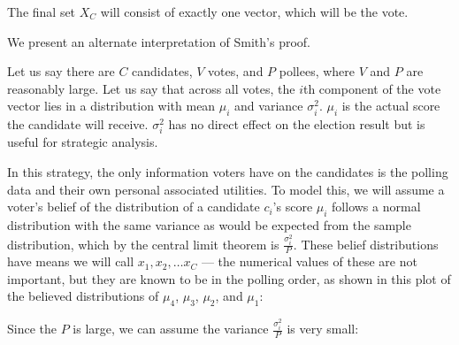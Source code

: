 \documentclass[11pt]{article}
\begin{document}
    The final set $X_C$ will consist of exactly one vector, which will be the vote.

    We present an alternate interpretation of Smith's proof.

    Let us say there are $C$ candidates, $V$ votes, and $P$ pollees,
    where $V$ and $P$ are reasonably large.
    Let us say that across all votes,
    the $i$th component of the vote vector
    lies in a distribution with mean $\mu_i$ and variance $\sigma_i^2$.
    $\mu_i$ is the actual score the candidate will receive.
    $\sigma_i^2$ has no direct effect on the election result but is useful for strategic analysis.

    In this strategy, the only information voters have on the candidates
    is the polling data and their own personal associated utilities.
    To model this, we will assume a voter's belief of the distribution
    of a candidate $c_i$'s score $\mu_i$ follows a normal distribution
    with the same variance as would be expected from the sample distribution,
    which by the central limit theorem is $\frac{\sigma_i^2}{P}$.
    These belief distributions have means we will call $x_1, x_2, \dots x_C$
    --- the numerical values of these are not important,
    but they are known to be in the polling order,
    as shown in this plot of the believed distributions of $\mu_4$, $\mu_3$, $\mu_2$, and $\mu_1$:


    Since the $P$ is large, we can assume the variance $\frac{\sigma_i^2}{P}$ is very small:
\end{document}
